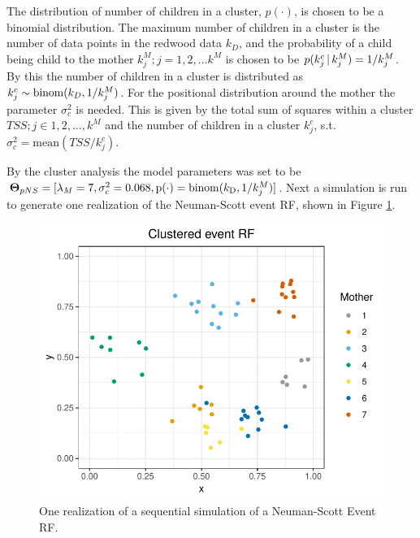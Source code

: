 The distribution of number of children in a cluster, $p(\cdot)$, is chosen to be a binomial distribution. The maximum number of children in a cluster is the number of data points in the redwood data $k_D$, and the probability of a child being child to the mother $k_j^M;j=1,2,...k^M$ is chosen to be $p(k_j^c \, | \, k_j^M) = 1/k_j^M$. By this the number of children in a cluster is distributed as $k_j^c \sim \mathrm{binom}(k_D,1/k_j^M)$. For the positional distribution around the mother the parameter $\sigma_c^2$ is needed. This is given by the total sum of squares within a cluster $TSS; j\in 1,2,...,k^M$ and the number of children in a cluster $k_j^c$, s.t. $\sigma_c^2 = \mathrm{mean}(TSS/k_j^c)$.

By the cluster analysis the model parameters was set to be $\bm{\Theta}_{pNS} = [\lambda_M = 7, \sigma_c^2 = 0.068, \mathrm{p}(\cdot) = \mathrm{binom}(k_\textrm{D},1/k_j^M)]$. Next a simulation is run to generate one realization of the Neuman-Scott event RF, shown in Figure \ref{fig:cluster_event_rf}.

\begin{figure}[H]
    \centering
    \includegraphics[scale=0.95]{figures/cluster_event_rf.pdf}
    \caption{One realization of a sequential simulation of a Neuman-Scott Event RF.}
    \label{fig:cluster_event_rf}
\end{figure}

